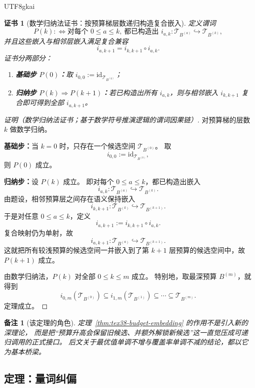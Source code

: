 \documentclass[12pt]{article}
\newtheorem{remark}{备注}[section]
\newtheorem{Certificate}{证书}[section]
\newcommand{\id}{\mathrm{id}}
\begin{document}
\begin{CJK*}{UTF8}{gkai}
\begin{Certificate}[数学归纳法证书：按预算梯层数递归构造复合嵌入]
\label{cert:tex38-budget-embedding}
定义谓词
\[
  P(k)
  :
  \Longleftrightarrow
  \text{对每个 }0\le a\le k,\ \text{都已构造出 }i_{a,k}:\mathcal T_{B^{(a)}}\hookrightarrow\mathcal T_{B^{(k)}},
\]
并且这些嵌入与相邻层嵌入满足复合兼容
\[
  i_{a,k+1}=i_{k,k+1}\circ i_{a,k}.
\]
证书分两部分：
\begin{enumerate}
  \item \textbf{基础步 $P(0)$：}取 $i_{0,0}:=\id_{\mathcal T_{B^{(0)}}}$；
  \item \textbf{归纳步 $P(k)\Rightarrow P(k+1)$：}若已构造出所有 $i_{a,k}$，则与相邻嵌入 $i_{k,k+1}$ 复合即可得到全部 $i_{a,k+1}$。
\end{enumerate}
\end{Certificate}

\begin{proof}[证明（数学归纳法证书；基于数学符号推演逻辑的谓词因果链）]
对预算梯的层数 $k$ 做数学归纳。

\textbf{基础步：}当 $k=0$ 时，只存在一个候选空间 $\mathcal T_{B^{(0)}}$。
取
\[
  i_{0,0}:=\id_{\mathcal T_{B^{(0)}}},
\]
则 $P(0)$ 成立。

\textbf{归纳步：}设 $P(k)$ 成立。
即对每个 $0\le a\le k$，都已构造出嵌入
\[
  i_{a,k}:\mathcal T_{B^{(a)}}\hookrightarrow\mathcal T_{B^{(k)}}.
\]
由题设，相邻预算层之间存在语义保持嵌入
\[
  i_{k,k+1}:\mathcal T_{B^{(k)}}\hookrightarrow\mathcal T_{B^{(k+1)}}.
\]
于是对任意 $0\le a\le k$，定义
\[
  i_{a,k+1}:=i_{k,k+1}\circ i_{a,k}.
\]
复合映射仍为单射，故
\[
  i_{a,k+1}:\mathcal T_{B^{(a)}}\hookrightarrow\mathcal T_{B^{(k+1)}}.
\]
这就把所有较浅预算的候选空间一并嵌入到了第 $k+1$ 层预算的候选空间中，故 $P(k+1)$ 成立。

由数学归纳法，$P(k)$ 对全部 $0\le k\le m$ 成立。
特别地，取最深预算 $B^{(m)}$，就得到
\[
  i_{0,m}(\mathcal T_{B^{(0)}})
  \subseteq
  i_{1,m}(\mathcal T_{B^{(1)}})
  \subseteq
  \cdots
  \subseteq
  \mathcal T_{B^{(m)}}.
\]
定理成立。
\end{proof}

\begin{remark}[该定理的角色]
定理~\ref{thm:tex38-budget-embedding} 的作用不是引入新的深理论，
而是把“预算升高会保留旧候选、并额外解锁新候选”这一直觉压成可递归调用的正式接口。
后文关于最优值单调不增与覆盖率单调不减的结论，都以它为基本桥梁。
\end{remark}

\subsection{定理：量词纠偏}
\label{subsec:tex38-quantifier-correction}


\end{CJK*}
\end{document}
